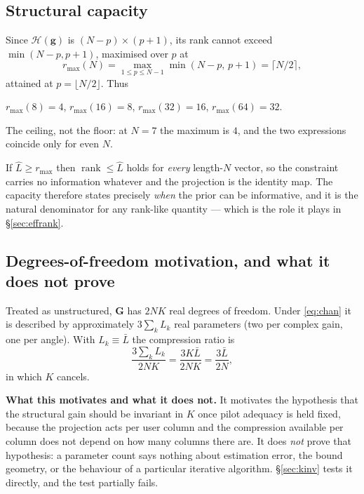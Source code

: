 \documentclass[journal]{IEEEtran}
\DeclareMathOperator{\rank}{rank}
\newcommand{\bG}{\mathbf{G}}
\newcommand{\bg}{\mathbf{g}}
\newcommand{\Hank}{\mathcal{H}}
\newcommand{\rmax}{r_{\max}}
\begin{document}
\subsection{Structural capacity}

Since $\Hank(\bg)$ is $(N-p)\times(p+1)$, its rank cannot exceed
$\min(N-p,p+1)$, maximised over $p$ at
\begin{equation}\label{eq:cap}
\rmax(N)=\max_{1\le p\le N-1}\min(N-p,\,p+1)=\bigl\lceil N/2\bigr\rceil,
\end{equation}
attained at $p=\lfloor N/2\rfloor$. Thus
\begin{center}
$\rmax(8)=4$, \quad $\rmax(16)=8$, \quad $\rmax(32)=16$, \quad $\rmax(64)=32$.
\end{center}
The ceiling, not the floor: at $N=7$ the maximum is $4$, and the two
expressions coincide only for even $N$.

If $\hat L\ge\rmax$ then $\rank\le\hat L$ holds for \emph{every} length-$N$
vector, so the constraint carries no information whatever and the projection
is the identity map. The capacity therefore states precisely \emph{when} the
prior can be informative, and it is the natural denominator for any rank-like
quantity --- which is the role it plays in \S\ref{sec:effrank}.

\subsection{Degrees-of-freedom motivation, and what it does not prove}

Treated as unstructured, $\bG$ has $2NK$ real degrees of freedom. Under
\eqref{eq:chan} it is described by approximately $3\sum_k L_k$ real parameters
(two per complex gain, one per angle). With $L_k\equiv\bar L$ the compression
ratio is
\begin{equation}\label{eq:compress}
\frac{3\sum_k L_k}{2NK}=\frac{3K\bar L}{2NK}=\frac{3\bar L}{2N},
\end{equation}
in which $K$ cancels.

\textbf{What this motivates and what it does not.} It motivates the hypothesis
that the structural gain should be invariant in $K$ once pilot adequacy is held
fixed, because the projection acts per user column and the compression
available per column does not depend on how many columns there are. It does
\emph{not} prove that hypothesis: a parameter count says nothing about
estimation error, the bound geometry, or the behaviour of a particular
iterative algorithm. \S\ref{sec:kinv} tests it directly, and the test partially
fails.
\end{document}
